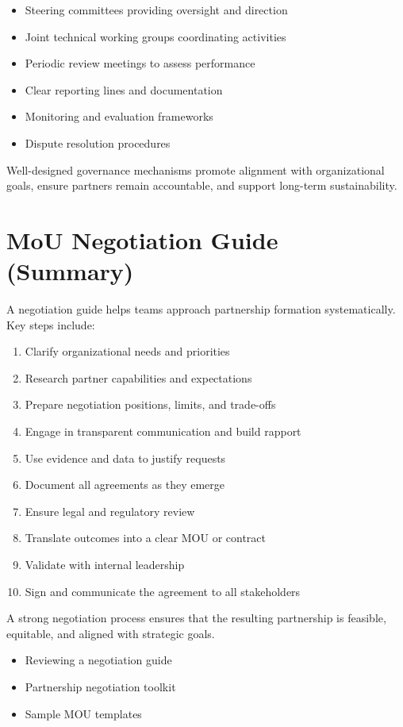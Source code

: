 \documentclass[10pt]{article}
\begin{document}
\begin{itemize}
  \item Steering committees providing oversight and direction
  \item Joint technical working groups coordinating activities
  \item Periodic review meetings to assess performance
  \item Clear reporting lines and documentation
  \item Monitoring and evaluation frameworks
  \item Dispute resolution procedures
\end{itemize}

Well-designed governance mechanisms promote alignment with organizational goals, ensure partners remain accountable, and support long-term sustainability.

\section*{MoU Negotiation Guide (Summary)}
A negotiation guide helps teams approach partnership formation systematically. Key steps include:

\begin{enumerate}
  \item Clarify organizational needs and priorities
  \item Research partner capabilities and expectations
  \item Prepare negotiation positions, limits, and trade-offs
  \item Engage in transparent communication and build rapport
  \item Use evidence and data to justify requests
  \item Document all agreements as they emerge
  \item Ensure legal and regulatory review
  \item Translate outcomes into a clear MOU or contract
  \item Validate with internal leadership
  \item Sign and communicate the agreement to all stakeholders
\end{enumerate}

A strong negotiation process ensures that the resulting partnership is feasible, equitable, and aligned with strategic goals.

\begin{itemize}
  \item Reviewing a negotiation guide
  \item Partnership negotiation toolkit
  \item Sample MOU templates
\end{itemize}
\end{document}

